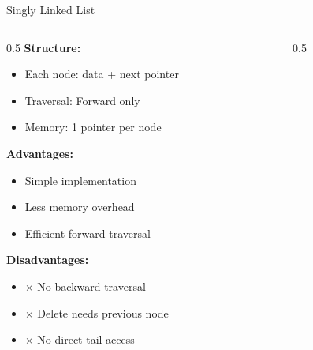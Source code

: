 \documentclass[aspectratio=169,xcolor=dvipsnames]{beamer}
\begin{document}
\begin{frame}{Singly Linked List}
  \begin{columns}
    \begin{column}{0.5\textwidth}
      \textbf{Structure:}
      \begin{itemize}
        \item Each node: data + next pointer
        \item Traversal: Forward only
        \item Memory: 1 pointer per node
      \end{itemize}

      \vspace{0.3cm}
      \textbf{Advantages:}
      \begin{itemize}
        \item \checkmark Simple implementation
        \item \checkmark Less memory overhead
        \item \checkmark Efficient forward traversal
      \end{itemize}

      \vspace{0.3cm}
      \textbf{Disadvantages:}
      \begin{itemize}
        \item $\times$ No backward traversal
        \item $\times$ Delete needs previous node
        \item $\times$ No direct tail access
      \end{itemize}
    \end{column}

    \begin{column}{0.5\textwidth}
      \begin{center}
\end{center}
\end{column}
\end{columns}
\end{frame}
\end{document}
